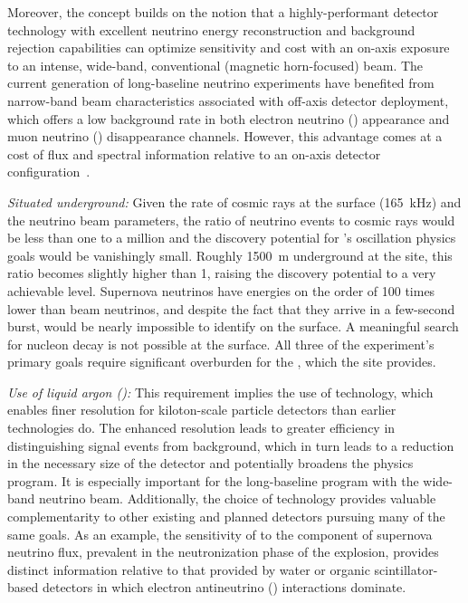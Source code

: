 Moreover, the  concept
    builds on the notion that a highly-performant detector technology  
    with excellent neutrino energy reconstruction
    and background rejection capabilities can
    optimize sensitivity and cost with an on-axis exposure to
    an intense, wide-band, conventional (magnetic horn-focused) beam.
   The current generation of long-baseline neutrino experiments
	have benefited from narrow-band beam characteristics 
	associated with off-axis detector deployment, which offers 
	a low background rate in both electron neutrino (\nue) appearance 
	and muon neutrino (\numu) disappearance channels. 
	However, this advantage comes at a cost of flux and 
	spectral information relative to an on-axis detector 
    configuration~\cite{Adams:2013qkq,Agarwalla:2014tca}.
    

\textit{Situated underground:}
Given the rate of cosmic rays at the surface (\SI{165}{kHz}) and the neutrino beam parameters, the ratio of neutrino events to cosmic rays would be less than one to a million and the discovery potential for 's oscillation physics goals would be vanishingly small.  Roughly \SI{1500}{m} underground at the  site, this ratio becomes slightly higher than 1, raising the discovery potential to a very achievable level.  Supernova neutrinos have energies on the order of \num{100} times lower than beam neutrinos, and despite the fact that they arrive in a few-second burst, would be nearly impossible to identify on the surface. A meaningful search for nucleon decay is not possible at the surface. All three of the experiment's primary goals require significant overburden for the , which the  site provides. 

\textit{Use of liquid argon (\lar):}
This requirement implies the use of  technology, which enables finer resolution for kiloton-scale particle
detectors than earlier technologies do. The enhanced resolution leads to greater efficiency in distinguishing signal events from background, which in turn leads to a reduction in the necessary size of the detector and potentially broadens the physics program.
    It is especially important for the long-baseline program with the  
    wide-band neutrino beam.
    Additionally, the choice of  technology provides 
    valuable complementarity to other 
    existing and planned detectors pursuing many
    of the same goals.  As an example,
    the sensitivity of  to the \nue component of supernova 
    neutrino flux, prevalent in the neutronization phase of the 
    explosion, provides distinct information relative to that 
    provided by water or organic scintillator-based detectors in 
    which electron antineutrino (\anue) interactions dominate. 

